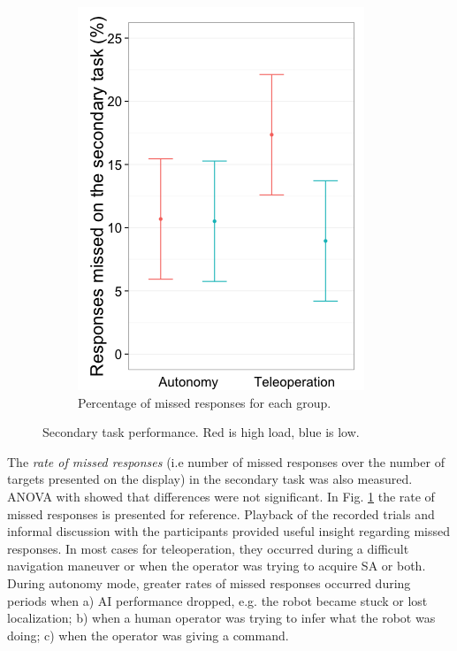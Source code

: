 \documentclass[a4paper,12pt,oneside,openright]{bhamthesis}
\begin{document}
\begin{figure}
\begin{subfigure}[b]{0.4\textwidth}
 		\includegraphics[width=\textwidth]{chapter3_fig/misses-cropped_pilot.png}
 		\caption{Percentage of missed responses for each group.}
 		\label{subfig:totalMissedRT_pilot}
 	\end{subfigure}
 	\hfill
 	\caption{Secondary task performance. Red is high load, blue is low.}
 	\label{fig:rt_pilot}
 \end{figure}

The \textit{rate of missed responses} (i.e number of missed responses over the number of targets presented on the display) in the secondary task was also measured. ANOVA with  showed that differences were not significant. In Fig. \ref{subfig:totalMissedRT_pilot} the rate of missed responses is presented for reference. Playback of the recorded trials and informal discussion with the participants provided useful insight regarding missed responses. In most cases for teleoperation, they occurred during a difficult navigation maneuver or when the operator was trying to acquire SA or both. During autonomy mode, greater rates of missed responses occurred during periods when a) AI performance dropped, e.g. the robot became stuck or lost localization; b) when a human operator was trying to infer what the robot was doing; c) when the operator was giving a command.
\end{document}
